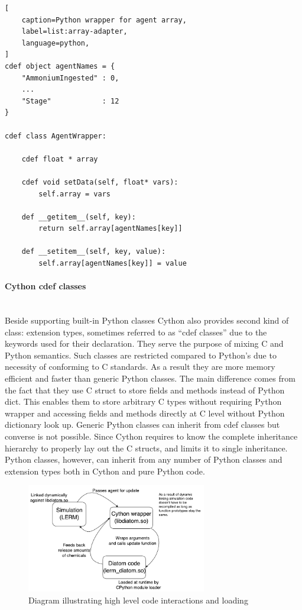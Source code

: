 \documentclass[12pt, a4paper]{report}
\newcommand{\myparagraph}[1]{\paragraph{#1}\mbox{}\\}
\begin{document}
\begin{lstlisting}[
    caption=Python wrapper for agent array,
    label=list:array-adapter,
    language=python,
]
cdef object agentNames = {
    "AmmoniumIngested" : 0,
    ...
    "Stage"            : 12
}

cdef class AgentWrapper:

    cdef float * array

    cdef void setData(self, float* vars):
        self.array = vars

    def __getitem__(self, key):
        return self.array[agentNames[key]]

    def __setitem__(self, key, value):
        self.array[agentNames[key]] = value
\end{lstlisting}

\myparagraph{Cython cdef classes}\label{para:cython-cdef}
Beside supporting built-in Python classes Cython also provides second kind of
class: extension types, sometimes referred to as “cdef classes” due to the
keywords used for their declaration. They serve the purpose of mixing C and
Python semantics. Such classes are restricted compared to Python's due to
necessity of conforming to C standards. As a result they are more
memory efficient and faster than generic Python classes. The main difference
comes from the fact that they use C struct to store fields and methods instead
of Python dict. This enables them to store arbitrary C types without requiring
Python wrapper and accessing fields and methods directly at C level without
Python dictionary look up. Generic Python classes can inherit from cdef classes
but converse is not possible. Since Cython requires to know the complete inheritance
hierarchy to properly lay out the C structs, and limits it to single inheritance.
Python classes, however, can inherit from any number of Python classes and
extension types both in Cython and pure Python code.
\\

\begin{figure}[H]
  \begin{center}
    \includegraphics[width=0.7\textwidth,natwidth=731,natheight=441]{images/embed-diagram.pdf}
    \caption{Diagram illustrating high level code interactions and loading}
    \label{fig:embed-diagram}
  \end{center}
\end{figure}
\end{document}
